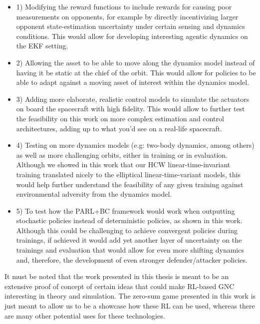 \begin{itemize}

    \item 1) Modifying the reward functions to include rewards for causing poor measurements on opponents, for example by directly incentivizing larger opponent state-estimation uncertainty under certain sensing and dynamics conditions. This would allow for developing interesting agentic dynamics on the EKF setting.

    \item 2) Allowing the asset to be able to move along the dynamics model instead of having it be static at the chief of the orbit. This would allow for policies to be able to adapt against a moving asset of interest within the dynamics model.

    \item 3) Adding more elaborate, realistic control models to simulate the actuators on board the spacecraft with high fidelity. This would allow to further test the feasibility on this work on more complex estimation and control architectures, adding up to what you'd see on a real-life spacecraft.

    \item 4) Testing on more dynamics models (e.g: two-body dynamics, among others) as well as more challenging orbits, either in training or in evaluation. Although we showed in this work that our HCW linear-time-invariant training translated nicely to the elliptical linear-time-variant models, this would help further understand the feasibility of any given training against environmental adversity from the dynamics model.

    \item 5) To test how the PARL+BC framework would work when outputting stochastic policies instead of deterministic policies, as shown in this work. Although this could be challenging to achieve convergent policies during trainings, if achieved it would add yet another layer of uncertainty on the trainings and evaluation that would allow for even more shifting dynamics and, therefore, the development of even stronger defender/attacker policies.
\end{itemize}


It must be noted that the work presented in this thesis is meant to be an extensive proof of concept of certain ideas that could make RL-based GNC interesting in theory and simulation. The zero-sum game presented in this work is just meant to allow us to be a showcase how these RL can be used, whereas there are many other potential uses for these technologies.

